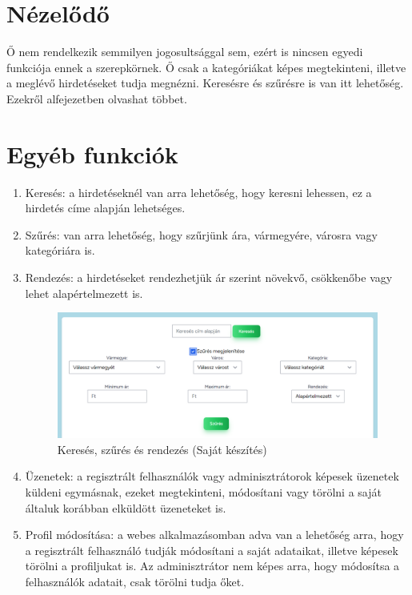 \documentclass[]{thesis-ekf}
\theoremstyle{definition}
\theoremstyle{remark}
\begin{document}
	\section{Nézelődő}
	Ő nem rendelkezik semmilyen jogosultsággal sem, ezért is nincsen egyedi funkciója ennek a szerepkörnek. Ő csak a kategóriákat képes megtekinteni, illetve a meglévő hirdetéseket tudja megnézni. Keresésre és szűrésre is van itt lehetőség. Ezekről  alfejezetben olvashat többet.
	\section{Egyéb funkciók}\label{egyeb-funkciok}
	\begin{enumerate}
		\item Keresés: a hirdetéseknél van arra lehetőség, hogy keresni lehessen, ez a hirdetés címe alapján lehetséges.
		\item Szűrés: van arra lehetőség, hogy szűrjünk ára, vármegyére, városra vagy kategóriára is.
		\item Rendezés: a hirdetéseket rendezhetjük ár szerint növekvő, csökkenőbe vagy lehet alapértelmezett is.
			\begin{figure}[ht!]
			\centering
			\includegraphics[width=13cm]{./felhasznaloi/kereses-szures}
			\caption{Keresés, szűrés és rendezés (Saját készítés)} 
			\label{kereses-szures-muvelet}
		\end{figure}
		\item Üzenetek: a regisztrált felhasználók vagy adminisztrátorok képesek üzenetek küldeni egymásnak, ezeket megtekinteni, módosítani vagy törölni a saját általuk korábban elküldött üzeneteket is.
		\item Profil módosítása: a webes alkalmazásomban adva van a lehetőség arra, hogy a regisztrált felhasználó tudják módosítani a saját adataikat, illetve képesek törölni a profiljukat is. Az adminisztrátor nem képes arra, hogy módosítsa a felhasználók adatait, csak törölni tudja őket.
	\end{enumerate}
	
\end{document}
